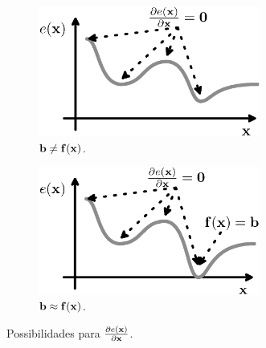 \begin{myproofT}
\begin{figure}[!h]
     \centering
     \begin{subfigure}[b]{0.48\textwidth}
         \centering
         \includegraphics[width=0.8\textwidth]{chapters/minimization-fx/minimoex2.eps}
         \caption{$\VECTOR{b} \neq \VECTOR{f}(\VECTOR{x})$.}
         \label{fig:ex0b}
     \end{subfigure}
     \hfill
     \begin{subfigure}[b]{0.48\textwidth}
         \centering
         \includegraphics[width=0.8\textwidth]{chapters/minimization-fx/minimoex1.eps}
         \caption{$\VECTOR{b} \approx \VECTOR{f}(\VECTOR{x})$.}
         \label{fig:ex0a}
     \end{subfigure}
        \caption{Possibilidades para $\frac{\partial e(\VECTOR{x})}{\partial \VECTOR{x} }$.}
        \label{fig:ex0}
\end{figure}



\end{myproofT}
